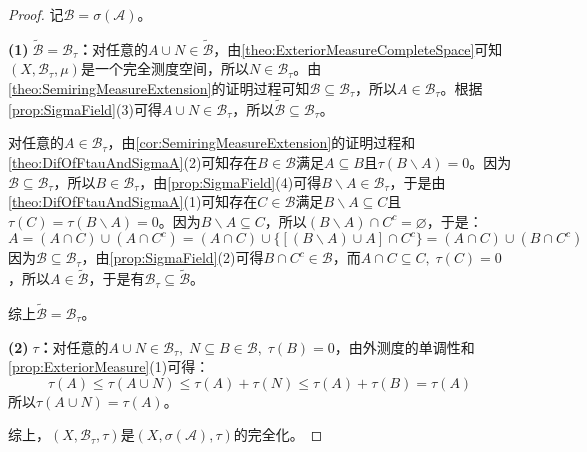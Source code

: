 \begin{proof}
	记$\mathscr{B}=\sigma(\mathscr{A})$。\par
	\textbf{(1)$\;\tilde{\mathscr{B}}=\mathscr{B}_\tau$：}对任意的$A\cup N\in\tilde{\mathscr{B}}$，由\cref{theo:ExteriorMeasureCompleteSpace}可知$(X,\mathscr{B}_\tau,\mu)$是一个完全测度空间，所以$N\in\mathscr{B}_\tau$。由\cref{theo:SemiringMeasureExtension}的证明过程可知$\mathscr{B}\subseteq\mathscr{B}_\tau$，所以$A\in\mathscr{B}_\tau$。根据\cref{prop:SigmaField}(3)可得$A\cup N\in\mathscr{B}_\tau$，所以$\tilde{\mathscr{B}}\subseteq\mathscr{B}_\tau$。\par
	对任意的$A\in\mathscr{B}_\tau$，由\cref{cor:SemiringMeasureExtension}的证明过程和\cref{theo:DifOfFtauAndSigmaA}(2)可知存在$B\in\mathscr{B}$满足$A\subseteq B$且$\tau(B\backslash A)=0$。因为$\mathscr{B}\subseteq\mathscr{B}_\tau$，所以$B\in\mathscr{B}_\tau$，由\cref{prop:SigmaField}(4)可得$B\backslash A\in\mathscr{B}_\tau$，于是由\cref{theo:DifOfFtauAndSigmaA}(1)可知存在$C\in\mathscr{B}$满足$B\backslash A\subseteq C$且$\tau(C)=\tau(B\backslash A)=0$。因为$B\backslash A\subseteq C$，所以$(B\backslash A)\cap C^c=\varnothing$，于是：
	\begin{equation*}
		A=(A\cap C)\cup(A\cap C^c)=(A\cap C)\cup\{[(B\backslash A)\cup A]\cap C^c\}=(A\cap C)\cup(B\cap C^c)
	\end{equation*}
	因为$\mathscr{B}\subseteq\mathscr{B}_\tau$，由\cref{prop:SigmaField}(2)可得$B\cap C^c\in\mathscr{B}$，而$A\cap C\subseteq C,\;\tau(C)=0$，所以$A\in\tilde{\mathscr{B}}$，于是有$\mathscr{B}_\tau\subseteq\tilde{\mathscr{B}}$。\par
	综上$\tilde{\mathscr{B}}=\mathscr{B}_\tau$。\par
	\textbf{(2)$\;\tau$：}对任意的$A\cup N\in\mathscr{B}_\tau,\;N\subseteq B\in\mathscr{B},\;\tau(B)=0$，由外测度的单调性和\cref{prop:ExteriorMeasure}(1)可得：
	\begin{equation*}
		\tau(A)\leqslant\tau(A\cup N)\leqslant\tau(A)+\tau(N)\leqslant\tau(A)+\tau(B)=\tau(A)
	\end{equation*}
	所以$\tau(A\cup N)=\tau(A)$。\par
	综上，$(X,\mathscr{B}_\tau,\tau)$是$(X,\sigma(\mathscr{A}),\tau)$的完全化。
\end{proof}